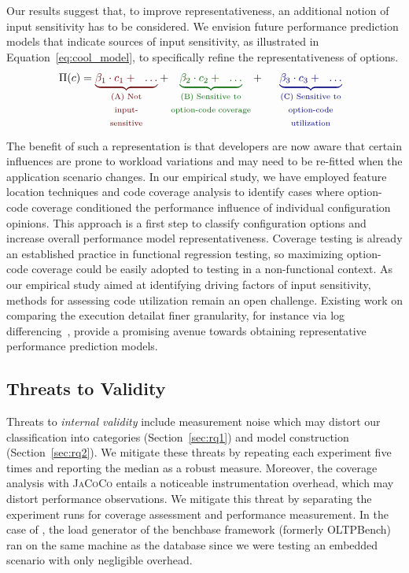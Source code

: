 Our results suggest that, to improve representativeness, an additional notion of input sensitivity has to be considered. We envision future performance prediction models that indicate sources of input sensitivity, as illustrated in Equation~\ref{eq:cool_model}, to specifically refine the representativeness of options.
\begin{equation}
	\Pi(c) = {\color{red!40!black}
		\underbrace{\beta_1 \cdot c_1 + ~~\ldots}_{\text{\parbox{1.4cm}{\centering(A) Not input-sensitive}}}
	} + {\color{green!40!black}
		\underbrace{\beta_2 \cdot c_2 +  ~~\ldots}_{\text{\parbox{2.55cm}{\centering(B) Sensitive to  option-code coverage}}}
	} + ~~
	{\color{blue!50!black}
		\underbrace{\beta_3 \cdot c_3 + ~~\ldots}_{\text{\parbox{2.5cm}{\centering(C) Sensitive to option-code utilization}}}
	}
	\label{eq:cool_model}
\end{equation}

The benefit of such a representation is that developers are now aware that certain influences are prone to workload variations and may need to be re-fitted when the application scenario changes.
In our empirical study, we have employed feature location techniques and code coverage analysis to identify cases where option-code coverage conditioned the performance influence of individual configuration opinions. This approach is a first step to classify configuration options and increase overall performance model representativeness. Coverage testing is already an established practice in functional regression testing, so maximizing option-code coverage could be easily adopted to testing in a non-functional context. 
As our empirical study aimed at identifying driving factors of input sensitivity, methods for assessing code utilization remain an open challenge. Existing work on comparing the execution detailat finer granularity, for instance via log differencing~\cite{bao_logdiff_ase_2019}, provide a promising avenue towards obtaining representative performance prediction models.

\subsection{Threats to Validity}\label{sec:threats}
Threats to \emph{internal validity} include measurement noise which may distort our classification into categories (Section~\ref{sec:rq1}) and model construction (Section~\ref{sec:rq2}). We mitigate these threats by repeating each experiment five times and reporting the median as a robust measure. %
Moreover, the coverage analysis with \mbox{\textsc{JaCoCo}} entails a noticeable instrumentation overhead, which may distort performance observations. We mitigate this threat by separating the experiment runs for coverage assessment and performance measurement. In the case of \htwo, the load generator of the \textsf{benchbase} framework (formerly \textsf{OLTPBench})~\cite{difallah_oltp_2013} ran on the same machine as the database since we were testing an embedded scenario with only negligible overhead.

